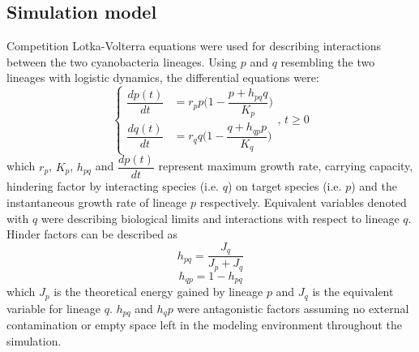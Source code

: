 \documentclass[../thesis.tex]{subfiles} %
\begin{document}
\subsection{Simulation model}
Competition Lotka-Volterra equations were used for describing interactions between the two cyanobacteria lineages.  Using $p$ and $q$ resembling the two lineages with logistic dynamics, the differential equations were:
\begin{equation}
    \left\{\begin{array}{rl}
        \dfrac{dp(t)}{dt} &= r_pp\Big(1-\dfrac{p+h_{pq}q}{K_p}\Big)\\
        \dfrac{dq(t)}{dt} &= r_qq\Big(1-\dfrac{q+h_{qp}p}{K_q}\Big)
    \end{array}\right.\text{, }t\geq0
    \label{eq:main}
\end{equation}
which $r_p$, $K_p$, $h_{pq}$ and $\dfrac{dp(t)}{dt}$ represent maximum growth rate, carrying capacity, hindering factor by interacting species (i.e. $q$) on target species (i.e. $p$) and the instantaneous growth rate of lineage $p$ respectively.  Equivalent variables denoted with $q$ were describing biological limits and interactions with respect to lineage $q$.  Hinder factors can be described as
\begin{equation}
    h_{pq} = \dfrac{J_q}{J_p+J_q}
    \label{eq:hinder1}
\end{equation}
\begin{equation}
    h_{qp} = 1-h_{pq}
    \label{eq:hinder2}
\end{equation}
which $J_p$ is the theoretical energy gained by lineage $p$ and $J_q$ is the equivalent variable for lineage $q$.  $h_{pq}$ and $h_qp$ were antagonistic factors assuming no external contamination or empty space left in the modeling environment throughout the simulation.
\end{document}
